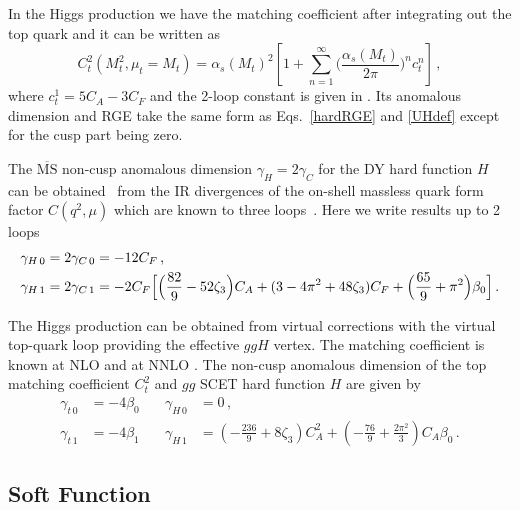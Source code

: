 \documentclass[a4,letterpaper,11pt]{article}
\newcommand{\nn}{\nonumber}
\newcommand{\be}{\begin{equation}}
\newcommand{\ee}{\end{equation}}
\newcommand{\as}{\alpha_s}
\newcommand{\eqs}[2]{Eqs.~\eqref{#1} and \eqref{#2}}
\begin{document}
In the Higgs production we have the matching coefficient after integrating out the top quark and it can be written as
\be
\label{Ct}
C_t^2(M_t^2,\mu_t=M_t)=\as(M_t)^2 \left[1+ \sum_{n=1}^\infty \biggl(\frac{\as(M_t)}{2\pi}\biggr)^n c_t^n\right]
\,,
\ee
where $c_t^1=5 C_A-3C_F$ and the 2-loop constant is given in \cite{Harlander:2009bw,Pak:2009bx}.
Its anomalous dimension and RGE take the same form as \eqs{hardRGE}{UHdef} except for the cusp part being zero.


The $\overline{\mathrm{MS}}$ non-cusp anomalous dimension $\gamma_H = 2\gamma_C$ for the DY hard function $H$ can be obtained~\cite{Idilbi:2006dg, Becher:2006mr} from the IR divergences of the on-shell massless quark form factor $C(q^2,\mu)$ which are known to three loops~\cite{Moch:2005id}.
Here we write results up to 2 loops
\begin{align} \label{gaHexp}
\gamma_{H\,0} &=2 \gamma_{C\,0} = -12 C_F
\,,\nn\\
\gamma_{H\,1} &=2\gamma_{C\,1}
= -2 C_F 
\Bigl[
  \Bigl(\frac{82}{9} - 52 \zeta_3\Bigr) C_A
+ (3 - 4 \pi^2 + 48 \zeta_3) C_F
+ \Bigl(\frac{65}{9} + \pi^2 \Bigr) \beta_0 \Bigr]
\,.\end{align}

The Higgs production can be obtained from virtual corrections with the virtual top-quark loop providing the effective $ggH$ vertex. The matching coefficient is known at NLO \cite{Harlander:2005rq,Anastasiou:2006hc} and at NNLO \cite{Harlander:2009bw,Pak:2009bx}.
The non-cusp anomalous dimension of the top matching coefficient $C_t^2$ and $gg$ SCET hard function $H$ are given by
\begin{align} \label{gaHexp-g}
\gamma_{t\,0} &=-4\beta_0 &\quad \gamma_{H\,0} &= 0 \,,\\
\gamma_{t\,1}&= -4\beta_1 &\quad \gamma_{H\,1} &=\left( -\frac{236}{9}+8\zeta_3 \right) C_A^2 +\left( -\frac{76}{9} +\frac{2\pi^2}{3}\right) C_A \beta_0\nn
\,.\end{align}

\subsection{Soft Function}
\end{document}
